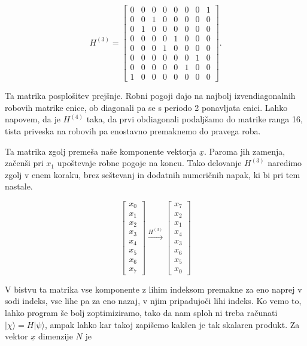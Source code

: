 \documentclass[a4 paper, 12pt]{article}
\begin{document}
\begin{equation}
	H^{(3)} = \begin{bmatrix}
	0 & 0 & 0 & 0 & 0 & 0 & 0 & 1 \\
	0 & 0 & 1 & 0 & 0 & 0 & 0 & 0 \\
	0 & 1 & 0 & 0 & 0 & 0 & 0 & 0 \\
	0 & 0 & 0 & 0 & 1 & 0 & 0 & 0 \\
	0 & 0 & 0 & 1 & 0 & 0 & 0 & 0 \\
	0 & 0 & 0 & 0 & 0 & 0 & 1 & 0 \\
	0 & 0 & 0 & 0 & 0 & 1 & 0 & 0 \\
	1 & 0 & 0 & 0 & 0 & 0 & 0 & 0
	\end{bmatrix}.
\end{equation}

Ta matrika posplošitev prejšnje. Robni pogoji dajo na najbolj izvendiagonalnih robovih matrike enice, ob diagonali pa
se s periodo 2 ponavljata enici. Lahko napovem, da je $H^{(4)}$ taka, da prvi obdiagonali podaljšamo do matrike ranga
16, tista priveska na robovih pa enostavno premaknemo do pravega roba.

Ta matrika zgolj premeša naše komponente vektorja $\underline{x}$. Paroma jih zamenja, začenši pri $x_1$ upoštevaje
robne pogoje na koncu. Tako delovanje $H^{(3)}$ naredimo zgolj v enem koraku, brez seštevanj in dodatnih numeričnih
napak, ki bi pri tem nastale.

\[
	\begin{bmatrix}
	x_0 \\
	x_1 \\
	x_2 \\
	x_3 \\
	x_4 \\
	x_5 \\
	x_6 \\
	x_7
	\end{bmatrix} \stackrel{H^{(3)}}{\longrightarrow}
	\begin{bmatrix}
	x_7 \\
	x_2 \\
	x_1 \\
	x_4 \\
	x_3 \\
	x_6 \\
	x_5 \\
	x_0
	\end{bmatrix}
\]

V bistvu ta matrika vse komponente z lihim indeksom premakne za eno naprej v sodi indeks, vse lihe pa za eno nazaj,
v njim pripadujoči lihi indeks. Ko vemo to, lahko program še bolj zoptimiziramo, tako da nam sploh ni treba računati
$|\chi\rangle = H |\psi\rangle$, ampak lahko kar takoj zapišemo kakšen je tak skalaren produkt. Za vektor
$\underline{x}$ dimenzije $N$ je
\end{document}
